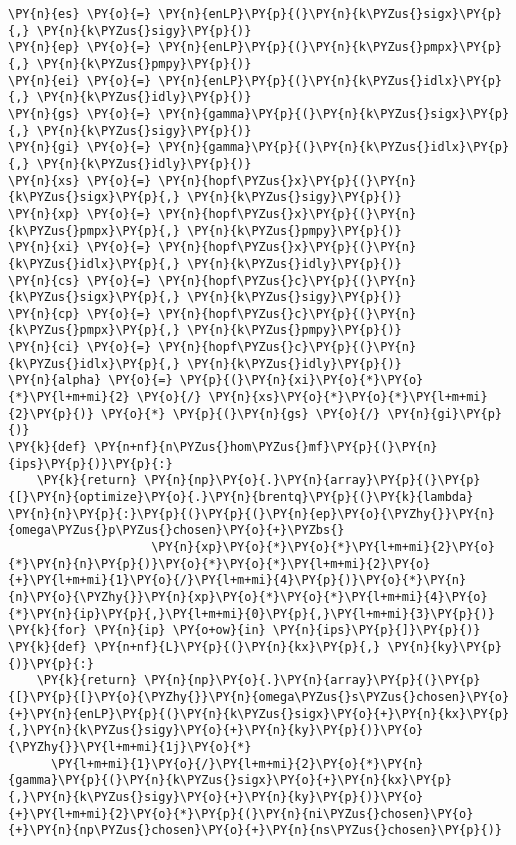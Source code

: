 \begin{Verbatim}[commandchars=\\\{\}]
\PY{n}{es} \PY{o}{=} \PY{n}{enLP}\PY{p}{(}\PY{n}{k\PYZus{}sigx}\PY{p}{,} \PY{n}{k\PYZus{}sigy}\PY{p}{)}
\PY{n}{ep} \PY{o}{=} \PY{n}{enLP}\PY{p}{(}\PY{n}{k\PYZus{}pmpx}\PY{p}{,} \PY{n}{k\PYZus{}pmpy}\PY{p}{)}
\PY{n}{ei} \PY{o}{=} \PY{n}{enLP}\PY{p}{(}\PY{n}{k\PYZus{}idlx}\PY{p}{,} \PY{n}{k\PYZus{}idly}\PY{p}{)}
\PY{n}{gs} \PY{o}{=} \PY{n}{gamma}\PY{p}{(}\PY{n}{k\PYZus{}sigx}\PY{p}{,} \PY{n}{k\PYZus{}sigy}\PY{p}{)}
\PY{n}{gi} \PY{o}{=} \PY{n}{gamma}\PY{p}{(}\PY{n}{k\PYZus{}idlx}\PY{p}{,} \PY{n}{k\PYZus{}idly}\PY{p}{)}
\PY{n}{xs} \PY{o}{=} \PY{n}{hopf\PYZus{}x}\PY{p}{(}\PY{n}{k\PYZus{}sigx}\PY{p}{,} \PY{n}{k\PYZus{}sigy}\PY{p}{)}
\PY{n}{xp} \PY{o}{=} \PY{n}{hopf\PYZus{}x}\PY{p}{(}\PY{n}{k\PYZus{}pmpx}\PY{p}{,} \PY{n}{k\PYZus{}pmpy}\PY{p}{)}
\PY{n}{xi} \PY{o}{=} \PY{n}{hopf\PYZus{}x}\PY{p}{(}\PY{n}{k\PYZus{}idlx}\PY{p}{,} \PY{n}{k\PYZus{}idly}\PY{p}{)}
\PY{n}{cs} \PY{o}{=} \PY{n}{hopf\PYZus{}c}\PY{p}{(}\PY{n}{k\PYZus{}sigx}\PY{p}{,} \PY{n}{k\PYZus{}sigy}\PY{p}{)}
\PY{n}{cp} \PY{o}{=} \PY{n}{hopf\PYZus{}c}\PY{p}{(}\PY{n}{k\PYZus{}pmpx}\PY{p}{,} \PY{n}{k\PYZus{}pmpy}\PY{p}{)}
\PY{n}{ci} \PY{o}{=} \PY{n}{hopf\PYZus{}c}\PY{p}{(}\PY{n}{k\PYZus{}idlx}\PY{p}{,} \PY{n}{k\PYZus{}idly}\PY{p}{)}
\PY{n}{alpha} \PY{o}{=} \PY{p}{(}\PY{n}{xi}\PY{o}{*}\PY{o}{*}\PY{l+m+mi}{2} \PY{o}{/} \PY{n}{xs}\PY{o}{*}\PY{o}{*}\PY{l+m+mi}{2}\PY{p}{)} \PY{o}{*} \PY{p}{(}\PY{n}{gs} \PY{o}{/} \PY{n}{gi}\PY{p}{)}
\PY{k}{def} \PY{n+nf}{n\PYZus{}hom\PYZus{}mf}\PY{p}{(}\PY{n}{ips}\PY{p}{)}\PY{p}{:}
    \PY{k}{return} \PY{n}{np}\PY{o}{.}\PY{n}{array}\PY{p}{(}\PY{p}{[}\PY{n}{optimize}\PY{o}{.}\PY{n}{brentq}\PY{p}{(}\PY{k}{lambda} \PY{n}{n}\PY{p}{:}\PY{p}{(}\PY{p}{(}\PY{n}{ep}\PY{o}{\PYZhy{}}\PY{n}{omega\PYZus{}p\PYZus{}chosen}\PY{o}{+}\PYZbs{}
                    \PY{n}{xp}\PY{o}{*}\PY{o}{*}\PY{l+m+mi}{2}\PY{o}{*}\PY{n}{n}\PY{p}{)}\PY{o}{*}\PY{o}{*}\PY{l+m+mi}{2}\PY{o}{+}\PY{l+m+mi}{1}\PY{o}{/}\PY{l+m+mi}{4}\PY{p}{)}\PY{o}{*}\PY{n}{n}\PY{o}{\PYZhy{}}\PY{n}{xp}\PY{o}{*}\PY{o}{*}\PY{l+m+mi}{4}\PY{o}{*}\PY{n}{ip}\PY{p}{,}\PY{l+m+mi}{0}\PY{p}{,}\PY{l+m+mi}{3}\PY{p}{)} \PY{k}{for} \PY{n}{ip} \PY{o+ow}{in} \PY{n}{ips}\PY{p}{]}\PY{p}{)}
\PY{k}{def} \PY{n+nf}{L}\PY{p}{(}\PY{n}{kx}\PY{p}{,} \PY{n}{ky}\PY{p}{)}\PY{p}{:}
    \PY{k}{return} \PY{n}{np}\PY{o}{.}\PY{n}{array}\PY{p}{(}\PY{p}{[}\PY{p}{[}\PY{o}{\PYZhy{}}\PY{n}{omega\PYZus{}s\PYZus{}chosen}\PY{o}{+}\PY{n}{enLP}\PY{p}{(}\PY{n}{k\PYZus{}sigx}\PY{o}{+}\PY{n}{kx}\PY{p}{,}\PY{n}{k\PYZus{}sigy}\PY{o}{+}\PY{n}{ky}\PY{p}{)}\PY{o}{\PYZhy{}}\PY{l+m+mi}{1j}\PY{o}{*}
      \PY{l+m+mi}{1}\PY{o}{/}\PY{l+m+mi}{2}\PY{o}{*}\PY{n}{gamma}\PY{p}{(}\PY{n}{k\PYZus{}sigx}\PY{o}{+}\PY{n}{kx}\PY{p}{,}\PY{n}{k\PYZus{}sigy}\PY{o}{+}\PY{n}{ky}\PY{p}{)}\PY{o}{+}\PY{l+m+mi}{2}\PY{o}{*}\PY{p}{(}\PY{n}{ni\PYZus{}chosen}\PY{o}{+}\PY{n}{np\PYZus{}chosen}\PY{o}{+}\PY{n}{ns\PYZus{}chosen}\PY{p}{)}

\end{Verbatim}
